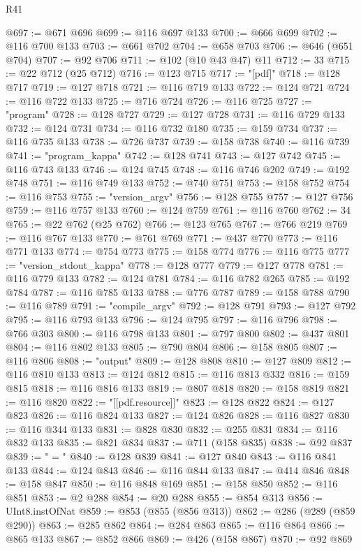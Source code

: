 \begin{lexlean}{R41}
\begin{coremodule}
@697 := @671 @696
@699 := @116 @697 @133
@700 := @666 @699
@702 := @116 @700 @133
@703 := @661 @702
@704 := @658 @703
@706 := @646 (@651 @704)
@707 := @92 @706
@711 := @102 (@10 @43 @47) @11
@712 := 33
@715 := @22 @712 (@25 @712)
@716 := @123 @715
@717 := "[pdf]"
@718 := @128 @717
@719 := @127 @718
@721 := @116 @719 @133
@722 := @124 @721
@724 := @116 @722 @133
@725 := @716 @724
@726 := @116 @725
@727 := "program"
@728 := @128 @727
@729 := @127 @728
@731 := @116 @729 @133
@732 := @124 @731
@734 := @116 @732 @180
@735 := @159 @734
@737 := @116 @735 @133
@738 := @726 @737
@739 := @158 @738
@740 := @116 @739
@741 := "program_kappa"
@742 := @128 @741
@743 := @127 @742
@745 := @116 @743 @133
@746 := @124 @745
@748 := @116 @746 @202
@749 := @192 @748
@751 := @116 @749 @133
@752 := @740 @751
@753 := @158 @752
@754 := @116 @753
@755 := "version_argv"
@756 := @128 @755
@757 := @127 @756
@759 := @116 @757 @133
@760 := @124 @759
@761 := @116 @760
@762 := 34
@765 := @22 @762 (@25 @762)
@766 := @123 @765
@767 := @766 @219
@769 := @116 @767 @133
@770 := @761 @769
@771 := @437 @770
@773 := @116 @771 @133
@774 := @754 @773
@775 := @158 @774
@776 := @116 @775
@777 := "version_stdout_kappa"
@778 := @128 @777
@779 := @127 @778
@781 := @116 @779 @133
@782 := @124 @781
@784 := @116 @782 @265
@785 := @192 @784
@787 := @116 @785 @133
@788 := @776 @787
@789 := @158 @788
@790 := @116 @789
@791 := "compile_argv"
@792 := @128 @791
@793 := @127 @792
@795 := @116 @793 @133
@796 := @124 @795
@797 := @116 @796
@798 := @766 @303
@800 := @116 @798 @133
@801 := @797 @800
@802 := @437 @801
@804 := @116 @802 @133
@805 := @790 @804
@806 := @158 @805
@807 := @116 @806
@808 := "output"
@809 := @128 @808
@810 := @127 @809
@812 := @116 @810 @133
@813 := @124 @812
@815 := @116 @813 @332
@816 := @159 @815
@818 := @116 @816 @133
@819 := @807 @818
@820 := @158 @819
@821 := @116 @820
@822 := "[[pdf.resource]]"
@823 := @128 @822
@824 := @127 @823
@826 := @116 @824 @133
@827 := @124 @826
@828 := @116 @827
@830 := @116 @344 @133
@831 := @828 @830
@832 := @255 @831
@834 := @116 @832 @133
@835 := @821 @834
@837 := @711 (@158 @835)
@838 := @92 @837
@839 := " = "
@840 := @128 @839
@841 := @127 @840
@843 := @116 @841 @133
@844 := @124 @843
@846 := @116 @844 @133
@847 := @414 @846
@848 := @158 @847
@850 := @116 @848 @169
@851 := @158 @850
@852 := @116 @851
@853 := @2 @288
@854 := @20 @288
@855 := @854 @313
@856 := UInt8.instOfNat
@859 := @853 (@855 (@856 @313))
@862 := @286 (@289 (@859 @290))
@863 := @285 @862
@864 := @284 @863
@865 := @116 @864
@866 := @865 @133
@867 := @852 @866
@869 := @426 (@158 @867)
@870 := @92 @869

\end{coremodule}
\end{lexlean}
